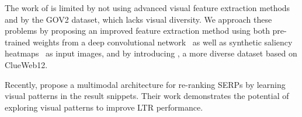 The work of \citet{fan2017learning} is limited by not using advanced visual feature extraction methods and by the GOV2 dataset, which lacks visual diversity.
We approach these problems by proposing an improved feature extraction method using both pre-trained weights from a deep convolutional network~\cite{simonyan2014very} as well as synthetic saliency heatmaps~\cite{shan2017two} as input images, and by introducing \datasetname, a more diverse dataset based on ClueWeb12.

Recently, \citet{zhang2018relevance} propose a multimodal architecture for re-ranking \acp{SERP} by learning visual patterns in the result snippets. 
Their work demonstrates the potential of exploring visual patterns to improve \ac{LTR} performance. 





